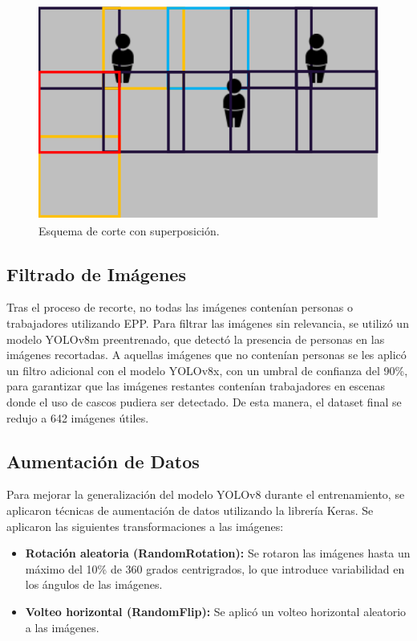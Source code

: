 \begin{itemize}
\begin{figure}[!ht]
  \centering
  \includegraphics[width=.49\linewidth]{images/full_cropping.png}
  \caption{Esquema de corte con superposición.}
  \label{fig:full_cropping}
\end{figure}

\end{itemize}

\subsection{Filtrado de Imágenes}

Tras el proceso de recorte, no todas las imágenes contenían personas o trabajadores utilizando EPP. Para filtrar las imágenes sin relevancia, se utilizó un modelo YOLOv8m preentrenado, que detectó la presencia de personas en las imágenes recortadas. A aquellas imágenes que no contenían personas se les aplicó un filtro adicional con el modelo YOLOv8x, con un umbral de confianza del 90\%, para garantizar que las imágenes restantes contenían trabajadores en escenas donde el uso de cascos pudiera ser detectado. De esta manera, el dataset final se redujo a 642 imágenes útiles.

\subsection{Aumentación de Datos}

Para mejorar la generalización del modelo YOLOv8 durante el entrenamiento, se aplicaron técnicas de aumentación de datos utilizando la librería Keras. Se aplicaron las siguientes transformaciones a las imágenes:

\begin{itemize}
  \item \textbf{Rotación aleatoria (RandomRotation):}  Se rotaron las imágenes hasta un máximo del 10\% de 360 grados centrigrados, lo que introduce variabilidad en los ángulos de las imágenes.
  \item \textbf{Volteo horizontal (RandomFlip):} Se aplicó un volteo horizontal aleatorio a las imágenes.
\end{itemize}


